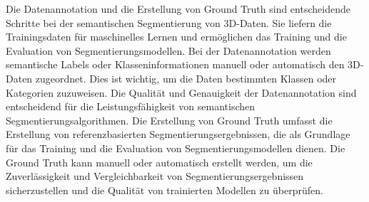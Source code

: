 Die Datenannotation und die Erstellung von Ground Truth sind entscheidende
Schritte bei der semantischen Segmentierung von 3D-Daten. Sie liefern die
Trainingsdaten für maschinelles Lernen und ermöglichen das Training und die
Evaluation von Segmentierungsmodellen. Bei der Datenannotation werden
semantische Labels oder Klasseninformationen manuell oder automatisch den
3D-Daten zugeordnet. Dies ist wichtig, um die Daten bestimmten Klassen oder
Kategorien zuzuweisen. Die Qualität und Genauigkeit der Datenannotation sind
entscheidend für die Leistungsfähigkeit von semantischen
Segmentierungsalgorithmen. Die Erstellung von Ground Truth umfasst die
Erstellung von referenzbasierten Segmentierungsergebnissen, die als Grundlage
für das Training und die Evaluation von Segmentierungsmodellen dienen. Die
Ground Truth kann manuell oder automatisch erstellt werden, um die
Zuverlässigkeit und Vergleichbarkeit von Segmentierungsergebnissen
sicherzustellen und die Qualität von trainierten Modellen zu überprüfen.